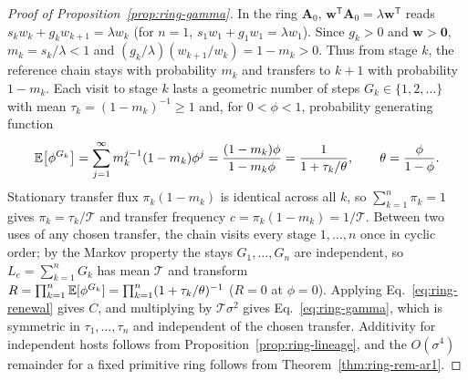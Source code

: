 \begin{proof}[Proof of Proposition~{\upshape\ref{prop:ring-gamma}}]
In the ring $\mathbf{A}_0$, $\mathbf{w}^{\mathsf{T}}\mathbf{A}_0 = \lambda\mathbf{w}^{\mathsf{T}}$ reads $s_k w_k + g_k w_{k+1} = \lambda w_k$ (for $n = 1$, $s_1 w_1 + g_1 w_1 = \lambda w_1$). Since $g_k > 0$ and $\mathbf{w} > \mathbf{0}$, $m_k = s_k/\lambda < 1$ and $(g_k/\lambda)(w_{k+1}/w_k) = 1 - m_k > 0$. Thus from stage $k$, the reference chain stays with probability $m_k$ and transfers to $k + 1$ with probability $1 - m_k$. Each visit to stage $k$ lasts a geometric number of steps $G_k \in \{1, 2, \dots\}$ with mean $\tau_k = (1 - m_k)^{-1} \ge 1$ and, for $0 < \phi < 1$, probability generating function
\[
\mathbb{E}\!\left[\phi^{G_k}\right] = \sum_{j=1}^{\infty} m_k^{j-1}(1 - m_k)\phi^j = \frac{(1 - m_k)\phi}{1 - m_k\phi} = \frac{1}{1 + \tau_k/\theta}, \qquad \theta = \frac{\phi}{1 - \phi}.
\]
Stationary transfer flux $\pi_k(1 - m_k)$ is identical across all $k$, so $\sum_{k=1}^n \pi_k = 1$ gives $\pi_k = \tau_k / \mathcal{T}$ and transfer frequency $c = \pi_k(1 - m_k) = 1/\mathcal{T}$. Between two uses of any chosen transfer, the chain visits every stage $1, \dots, n$ once in cyclic order; by the Markov property the stays $G_1, \dots, G_n$ are independent, so $L_e = \sum_{k=1}^n G_k$ has mean $\mathcal{T}$ and transform $R = \prod_{k=1}^n \mathbb{E}[\phi^{G_k}] = \prod_{k=1}^n (1 + \tau_k/\theta)^{-1}$ ($R = 0$ at $\phi = 0$). Applying Eq.~\eqref{eq:ring-renewal} gives $C$, and multiplying by $\mathcal{T}\sigma^2$ gives Eq.~\eqref{eq:ring-gamma}, which is symmetric in $\tau_1, \dots, \tau_n$ and independent of the chosen transfer. Additivity for independent hosts follows from Proposition~\ref{prop:ring-lineage}, and the $O(\sigma^4)$ remainder for a fixed primitive ring follows from Theorem~\ref{thm:ring-rem-ar1}.
\end{proof}


